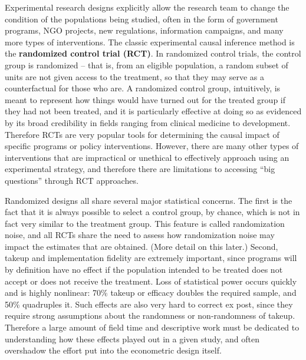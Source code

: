 Experimental research designs explicitly allow the research team
to change the condition of the populations being studied,
often in the form of government programs, NGO projects, new regulations,
information campaigns, and many more types of interventions.\cite{banerjee2009experimental}
The classic experimental causal inference method
is the \textbf{randomized control trial (RCT)}.
In randomized control trials, the control group is randomized --
that is, from an eligible population,
a random subset of units are not given access to the treatment,
so that they may serve as a counterfactual for those who are.
A randomized control group, intuitively, is meant to represent
how things would have turned out for the treated group
if they had not been treated, and it is particularly effective at doing so
as evidenced by its broad credibility in fields ranging from clinical medicine to development.
Therefore RCTs are very popular tools for determining the causal impact
of specific programs or policy interventions.
However, there are many other types of interventions that are impractical or unethical
to effectively approach using an experimental strategy,
and therefore there are limitations to accessing ``big questions''
through RCT approaches.

Randomized designs all share several major statistical concerns.
The first is the fact that it is always possible to select a control group,
by chance, which is not in fact very similar to the treatment group.
This feature is called randomization noise, and all RCTs share the need to assess
how randomization noise may impact the estimates that are obtained.
(More detail on this later.)
Second, takeup and implementation fidelity are extremely important,
since programs will by definition have no effect
if the population intended to be treated
does not accept or does not receive the treatment.
Loss of statistical power occurs quickly and is highly nonlinear:
70\% takeup or efficacy doubles the required sample, and 50\% quadruples it.
Such effects are also very hard to correct ex post,
since they require strong assumptions about the randomness or non-randomness of takeup.
Therefore a large amount of field time and descriptive work
must be dedicated to understanding how these effects played out in a given study,
and often overshadow the effort put into the econometric design itself.

